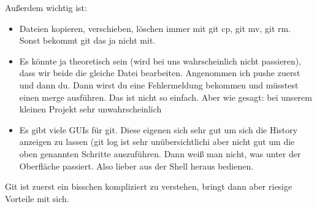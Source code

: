 \documentclass[a4paper,ngerman]{scrartcl} %
\begin{document}
Außerdem wichtig ist:
\begin{itemize}
\item Dateien kopieren, verschieben, löschen immer mit git cp, git mv, git rm. Sonst bekommt git das ja nicht mit.
\item Es könnte ja theoretisch sein (wird bei uns wahrscheinlich nicht passieren), dass wir beide die gleiche Datei bearbeiten. Angenommen ich pushe zuerst und dann du. Dann wirst du eine Fehlermeldung bekommen und müsstest einen merge ausführen. Das ist nicht so einfach. Aber wie gesagt: bei unserem kleinen Projekt sehr unwahrscheinlich
\item Es gibt viele GUIs für git. Diese eigenen sich sehr gut um sich die History anzeigen zu lassen (git log ist sehr unübersichtlich^^) aber nicht gut um die oben genannten Schritte auszuführen. Dann weiß man nicht, was unter der Oberfläche passiert. Also lieber aus der Shell heraus bedienen.
\end{itemize}

Git ist zuerst ein bisschen kompliziert zu verstehen, bringt dann aber riesige Vorteile mit sich.
\end{document}
